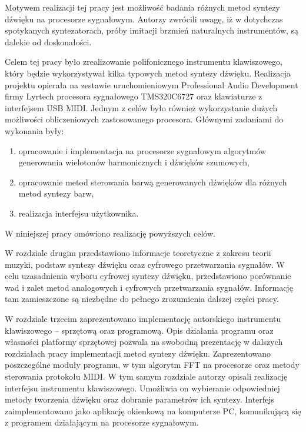 Motywem realizacji tej pracy jest możliwość badania różnych metod syntezy dźwięku na procesorze sygnałowym. 
Autorzy zwrócili uwagę, iż w dotychczas spotykanych syntezatorach, próby imitacji brzmień naturalnych instrumentów, są dalekie od doskonałości.

Celem tej pracy było zrealizowanie polifonicznego instrumentu klawiszowego, który będzie wykorzystywał kilka typowych metod syntezy dźwięku. Realizacja projektu opierała na zestawie uruchomieniowym Professional Audio Development firmy Lyrtech procesora sygnałowego TMS320C6727 oraz klawiaturze z interfejsem USB MIDI. Jednym z celów było również wykorzystanie dużych możliwości obliczeniowych zastosowanego procesora. Głównymi zadaniami do wykonania były:

\begin{enumerate}
    \item opracowanie i implementacja na procesorze sygnałowym algorytmów generowania 	wielotonów harmonicznych i dźwięków szumowych,
    
    \item opracowanie metod sterowania barwą generowanych dźwięków dla różnych metod syntezy barw,
    
    \item realizacja interfejsu użytkownika.
\end{enumerate}
W niniejszej pracy omówiono realizację powyższych celów.

W rozdziale drugim przedstawiono informacje teoretyczne z zakresu teorii muzyki, podstaw syntezy dźwięku oraz cyfrowego przetwarzania sygnałów. W celu uzasadnienia wyboru cyfrowej syntezy dźwięku, przedstawiono porównanie wad i zalet metod analogowych i cyfrowych przetwarzania sygnałów. Informację tam zamieszczone są niezbędne do pełnego zrozumienia dalszej części pracy.

W rozdziale trzecim zaprezentowano implementację autorskiego instrumentu klawiszowego – sprzętową oraz programową. Opis działania programu oraz własności platformy sprzętowej pozwala na swobodną prezentację w dalszych rozdziałach pracy implementacji metod syntezy dźwięku. Zaprezentowano poszczególne moduły programu, w tym algorytm FFT na procesorze oraz metody sterowania protokołu MIDI. W tym samym rozdziale autorzy opisali realizację interfejsu instrumentu klawiszowego. Umożliwia on wybieranie odpowiedniej metody tworzenia dźwięku oraz dobranie parametrów ich syntezy. Interfejs zaimplementowano jako aplikację okienkową na komputerze PC, komunikującą się z programem działającym na procesorze sygnałowym.

